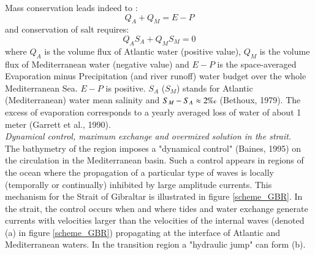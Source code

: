 \documentclass[a4paper,12pt]{article}
\begin{document}
Mass conservation leads indeed to : 
\begin{equation}  
	\label{Eq_mass}
    \displaystyle   
  	Q_A+Q_M = E-P
\end{equation}
and conservation of salt requires: 
\begin{equation}  
    \label{Eq_salt}
    \displaystyle   
    Q_A S_A + Q_M S_M =  0
\end{equation}
where $Q_A$ is the volume flux of Atlantic water (positive value), $Q_M$ is the volume flux of Mediterranean water (negative value) and $E-P$ is the space-averaged Evaporation minus Precipitation (and river runoff) water budget over the whole Mediterranean Sea. $E-P$ is positive. $S_A$ ($S_M$) stands for Atlantic (Mediterranean) water mean salinity and $S_M-S_A\approx 2\mbox{\textperthousand}$ (Bethoux, 1979). The excess of evaporation corresponds to a yearly averaged loss of water of about 1 meter (Garrett et al., 1990).\\

\textit{Dynamical control, maximum exchange and overmixed solution in the strait.}\\
The bathymetry of the region imposes a "dynamical control" (Baines, 1995) on the circulation in the Mediterranean basin. Such a control appears in regions of the ocean where the propagation of a particular type of waves is locally (temporally or continually) inhibited by large amplitude currents. This mechanism for the Strait of Gibraltar is illustrated in figure \ref{scheme_GBR}. In the strait, the control occurs when and where tides and water exchange generate currents with velocities larger than the velocities of the internal waves (denoted (a) in figure \ref{scheme_GBR}) propagating at the interface of Atlantic and Mediterranean waters. In the transition region a "hydraulic jump" can form (b).
\end{document}
